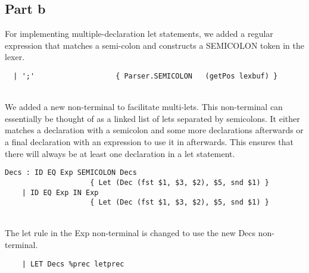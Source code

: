 \subsection*{Part b}

For implementing multiple-declaration let statements, we added a regular expression that matches a semi-colon and constructs a SEMICOLON token in the lexer.
\begin{verbatim}
  | ';'                   { Parser.SEMICOLON   (getPos lexbuf) }
\end{verbatim}
~\\

We added a new non-terminal to facilitate multi-lets. This non-terminal can essentially be thought of as a linked list of lets separated by semicolons. It either matches a declaration with a semicolon and some more declarations afterwards or a final declaration with an expression to use it in afterwards. This ensures that there will always be at least one declaration in a let statement.
\begin{verbatim}
Decs : ID EQ Exp SEMICOLON Decs
                    { Let (Dec (fst $1, $3, $2), $5, snd $1) }
    | ID EQ Exp IN Exp
                    { Let (Dec (fst $1, $3, $2), $5, snd $1) }
\end{verbatim}
~\\

The let rule in the Exp non-terminal is changed to use the new Decs non-terminal.
\begin{verbatim}
    | LET Decs %prec letprec
\end{verbatim}


